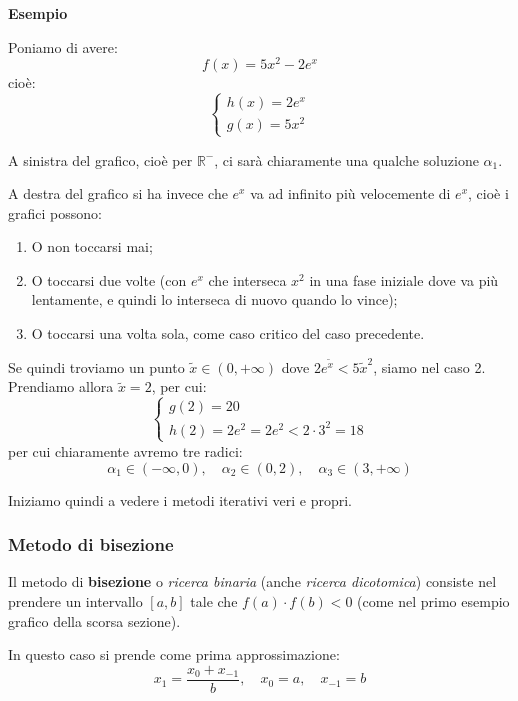 \documentclass[a4paper,11pt]{article}
\begin{document}
\begin{enumerate}
		\noindent
		\textbf{\textsf{Esempio}}
		
		Poniamo di avere:
		$$
		f(x) = 5x^2 - 2 e^x
		$$
		cioè:
		\[
			\begin{cases}
				h(x) = 2 e^x \\
				g(x) = 5 x^2
			\end{cases}
		\]	

		A sinistra del grafico, cioè per $\mathbb{R}^-$, ci sarà chiaramente una qualche soluzione $\alpha_1$.
		
		A destra del grafico si ha invece che $e^x$ va ad infinito più velocemente di $e^x$, cioè i grafici possono:
		\begin{enumerate}
			\item O non toccarsi mai;
			\item O toccarsi due volte (con $e^x$ che interseca $x^2$ in una fase iniziale dove va più lentamente, e quindi lo interseca di nuovo quando lo vince);
			\item O toccarsi una volta sola, come caso critico del caso precedente.
		\end{enumerate}

		Se quindi troviamo un punto $\tilde{x} \in (0, +\infty)$ dove $2e^{\tilde{x}} < 5 \tilde{x}^2$, siamo nel caso 2.
		Prendiamo allora $\tilde{x} = 2$, per cui:
		\[
			\begin{cases}
				g(2) = 20 \\
				h(2) = 2 e^2 = 2 e^2 < 2 \cdot 3^2 = 18
			\end{cases}
		\]
		per cui chiaramente avremo tre radici:
		$$
			\alpha_1 \in (-\infty, 0), \quad \alpha_2 \in (0, 2), \quad \alpha_3 \in (3, +\infty)
		$$

\end{enumerate}

\par\medskip

Iniziamo quindi a vedere i metodi iterativi veri e propri.
\subsubsection{Metodo di bisezione}
Il metodo di \textbf{bisezione} o \textit{ricerca binaria} (anche \textit{ricerca dicotomica}) consiste nel prendere un intervallo $[a, b]$ tale che $f(a) \cdot f(b) < 0$ (come nel primo esempio grafico della scorsa sezione).

In questo caso si prende come prima approssimazione:
$$
x_1 = \frac{x_0 + x_{-1}}{b}, \quad x_0 = a, \quad x_{-1} = b
$$
\end{document}
